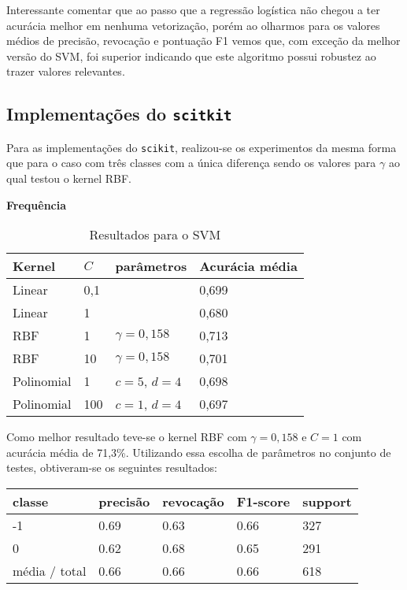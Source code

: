 Interessante comentar que ao passo que a regressão logística não chegou a ter
acurácia melhor em nenhuma vetorização, porém ao olharmos para os valores médios de precisão,
revocação e pontuação F1 vemos que, com exceção da melhor versão do SVM, foi superior indicando
que este algoritmo possui robustez ao trazer valores relevantes.

\subsection{Implementações do \texttt{scitkit}}

Para as implementações do \texttt{scikit}, realizou-se os experimentos da mesma forma que
para o caso com três classes com a única diferença sendo os valores para $\gamma$ ao qual
testou o kernel RBF.

\textbf{Frequência}

\begin{table}[H]
	\centering
	\caption{Resultados para o SVM}
	\begin{tabular}{l l l l}
		\hline
		Kernel & $C$ & parâmetros & Acurácia média \\
		\hline
		Linear & 0,1 & & 0,699 \\
		\hline
		Linear & 1 & & 0,680 \\
		\hline
		RBF & 1 & $\gamma = 0,158$ & 0,713 \\
		\hline
		RBF & 10 & $\gamma = 0,158$ & 0,701 \\
		\hline
		Polinomial & 1 & $c = 5$, $d = 4$ & 0,698 \\
		\hline
		Polinomial & 100 & $c = 1$, $d = 4$ & 0,697 \\
		\hline
	\end{tabular}
\end{table}

Como melhor resultado teve-se o kernel RBF com $\gamma = 0,158$ e $C = 1$ com acurácia média
de 71,3\%. Utilizando essa escolha de parâmetros no conjunto de testes, obtiveram-se
os seguintes resultados:

\begin{table}[H]
	\centering
		\begin{tabular}{l | l | l | l | l}
		\hline
		classe  	&	precisão  &  revocação &  F1-score &  support \\
		\hline
		 -1    &   0.69   &   0.63   &   0.66   &    327 \\
		 \hline
          0    &   0.62   &   0.68   &   0.65   &    291 \\
		\hline
		média / total   &    0.66   &   0.66   &   0.66   &    618 \\
		\hline
	\end{tabular}
\end{table}

